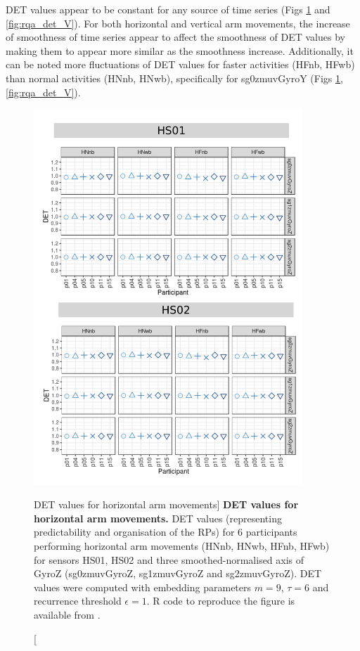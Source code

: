 DET values appear to be constant for any source of time series 
(Figs \ref{fig:rqa_det_H} and \ref{fig:rqa_det_V}).
For both horizontal and vertical arm movements, the increase of smoothness 
of time series appear to affect the smoothness of DET values by making them 
to appear more similar as the smoothness increase.
Additionally, it can be noted more fluctuations of DET values 
for faster activities (HFnb, HFwb) 
than normal activities (HNnb, HNwb), specifically for  sg0zmuvGyroY 
(Figs \ref{fig:rqa_det_H}, \ref{fig:rqa_det_V}).




\begin{figure}
\centering
\includegraphics[width=0.9\textwidth]{rqa_det_H_w500}
    \caption
	[DET values for horizontal arm movements]{
	{\bf DET values for horizontal arm movements.}	
    	DET values (representing predictability and organisation of the RPs)
	for 6 participants performing horizontal arm movements 
	(HNnb, HNwb, HFnb, HFwb)
	for sensors HS01, HS02 and three smoothed-normalised axis 
	of GyroZ (sg0zmuvGyroZ, sg1zmuvGyroZ and sg2zmuvGyroZ).
	DET values were computed with 
	embedding parameters $m=9$, $\tau=6$ and recurrence threshold
	$\epsilon=1$.
	R code to reproduce the figure is available from \cite{xochicale2018}.
        }
    \label{fig:rqa_det_H}
\end{figure}
